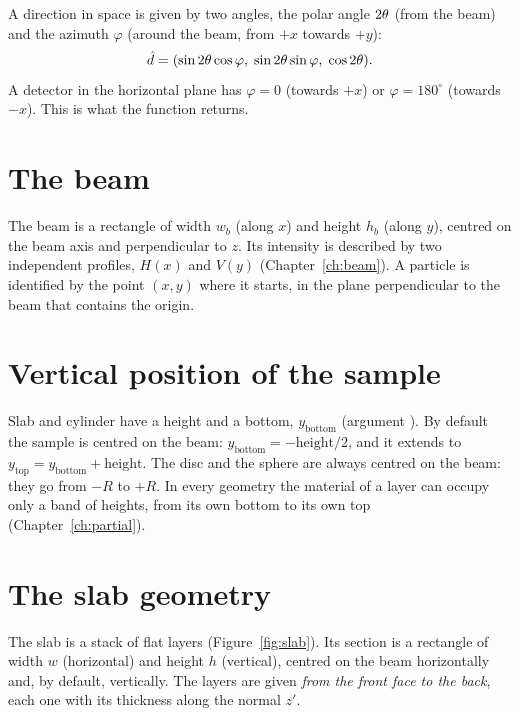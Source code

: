 A direction in space is given by two angles, the polar angle $2\theta$ (from the beam) and the azimuth
$\varphi$ (around the beam, from $+x$ towards $+y$):
\begin{equation}
  \hat{d} = (\sin2\theta\cos\varphi,\; \sin2\theta\sin\varphi,\; \cos2\theta).
\end{equation}
A detector in the horizontal plane has $\varphi=0$ (towards $+x$) or $\varphi=180^\circ$ (towards $-x$). This is
what the function  returns.

\section{The beam}

The beam is a rectangle of width $w_b$ (along $x$) and height $h_b$ (along $y$), centred on the beam axis and
perpendicular to $z$. Its intensity is described by two independent profiles, $H(x)$ and $V(y)$ (Chapter~\ref{ch:beam}).
A particle is identified by the point $(x,y)$ where it starts, in the plane perpendicular to the beam that contains
the origin.

\section{Vertical position of the sample}

Slab and cylinder have a height and a bottom, $y_\mathrm{bottom}$ (argument ). By default the sample is
centred on the beam: $y_\mathrm{bottom}=-\text{height}/2$, and it extends to $y_\mathrm{top}=y_\mathrm{bottom}+\text{height}$.
The disc and the sphere are always centred on the beam: they go from $-R$ to $+R$. In every geometry the material of a layer can occupy
only a band of heights, from its own bottom to its own top (Chapter~\ref{ch:partial}).

\section{The slab geometry}

The slab is a stack of flat layers (Figure~\ref{fig:slab}). Its section is a rectangle of width $w$ (horizontal)
and height $h$ (vertical), centred on the beam horizontally and, by default, vertically. The layers are given \emph{from the front face to the back}, each one with
its thickness along the normal $z'$.

